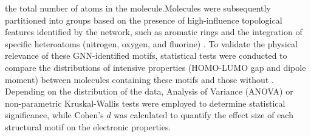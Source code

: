 \documentclass[]{article}
\begin{document}
the total number of atoms in the molecule.Molecules were subsequently partitioned into groups based on the presence of high-influence topological features identified by the network, such as aromatic rings and the integration of specific heteroatoms (nitrogen, oxygen, and fluorine) \citep{esders2024analyzingatomicinteractionsmolecules,polat2025understandingcapabilitiesmoleculargraph}. To validate the physical relevance of these GNN-identified motifs, statistical tests were conducted to compare the distributions of intensive properties (HOMO-LUMO gap and dipole moment) between molecules containing these motifs and those without \citep{gilmer2017neuralmessagepassingquantum,choi2022scalabletraininggraphconvolutional}. Depending on the distribution of the data, Analysis of Variance (ANOVA) or non-parametric Kruskal-Wallis tests were employed to determine statistical significance, while Cohen's $d$ was calculated to quantify the effect size of each structural motif on the electronic properties.
\end{document}
